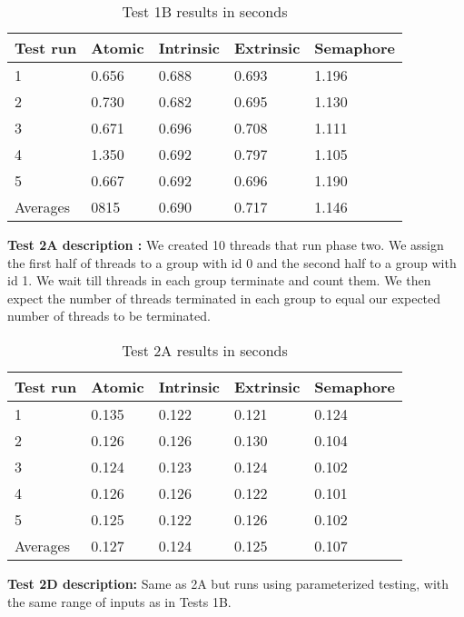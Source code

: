\documentclass[11pt]{article}
\begin{document}
\begin{table}[H]
\centering
\caption{Test 1B results in seconds}
\label{tab:my-table}
\begin{tabular}{|l|l|l|l|l|}
\hline
Test run & Atomic & Intrinsic & Extrinsic & Semaphore \\ \hline
1        & 0.656  & 0.688     & 0.693     & 1.196     \\ \hline
2        & 0.730  & 0.682     & 0.695     & 1.130     \\ \hline
3        & 0.671  & 0.696     & 0.708     & 1.111     \\ \hline
4        & 1.350  & 0.692     & 0.797     & 1.105     \\ \hline
5        & 0.667  & 0.692     & 0.696     & 1.190     \\ \hline
Averages & 0815   & 0.690     & 0.717     & 1.146     \\ \hline
\end{tabular}
\end{table}

\textbf{Test 2A description :} We created 10 threads that run phase two. We assign the first half of threads to a group with id 0 and the second half to a group with id 1. We wait till threads in each group terminate and count them. We then expect the number of threads terminated in each group to equal our expected number of threads to be terminated. \\


\begin{table}[H]
\centering
\caption{Test 2A results in seconds}
\label{tab:my-table}
\begin{tabular}{|l|l|l|l|l|}
\hline
Test run & Atomic & Intrinsic & Extrinsic & Semaphore \\ \hline
1        & 0.135  & 0.122     & 0.121     & 0.124     \\ \hline
2        & 0.126  & 0.126     & 0.130     & 0.104     \\ \hline
3        & 0.124  & 0.123     & 0.124     & 0.102     \\ \hline
4        & 0.126  & 0.126     & 0.122     & 0.101     \\ \hline
5        & 0.125  & 0.122     & 0.126     & 0.102     \\ \hline
Averages & 0.127  & 0.124     & 0.125     & 0.107     \\ \hline
\end{tabular}
\end{table}

\textbf{Test 2D description:} Same as 2A but runs using parameterized testing, with the same range of inputs as in Tests 1B.\\
\end{document}
